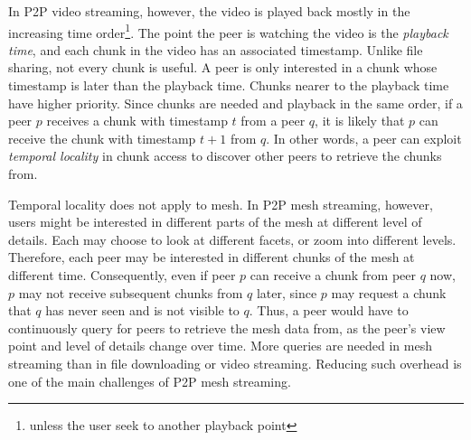     In P2P video streaming, however, the video is played
    back mostly in the increasing time order\footnote{unless the
    user seek to another playback point}.  The point the
    peer is watching the video is the \textit{playback
    time}, and each chunk in the video has an associated
    timestamp.  Unlike file sharing, not every chunk is
    useful.  A peer is only interested in a chunk whose
    timestamp is later than the playback time.  Chunks
    nearer to the playback time have higher priority.  
    Since chunks are
    needed and playback in the same order, if a peer $p$
    receives a chunk with timestamp $t$ from a peer $q$, it
    is likely that $p$ can receive the chunk with timestamp
    $t+1$ from $q$.  In other words, a peer can exploit
    \textit{temporal locality} in chunk access to discover
    other peers to retrieve the chunks from.


    Temporal locality does not apply to mesh.  In P2P mesh
    streaming, however, users might be interested in
    different parts of the mesh at different level of
    details.  Each may choose to look at different facets,
    or zoom into different levels.  Therefore, each peer may
    be interested in different chunks of the mesh at
    different time.  Consequently, even if peer $p$ can
    receive a chunk from peer $q$ now, $p$ may not receive
    subsequent chunks from $q$ later, since $p$ may request
    a chunk that $q$ has never seen and is not visible to
    $q$. %
    Thus, a peer would have
    to continuously query for peers to retrieve the mesh
    data from, as the peer's view point and level of details
    change over time.  More queries are needed in mesh
    streaming than in file downloading or video streaming.
    Reducing such overhead is one of the main challenges of
    P2P mesh streaming.

